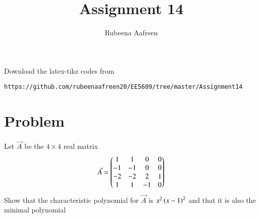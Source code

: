 \documentclass[journal,12pt]{IEEEtran}
\begin{document}
     \def\rightbox#1{\makebox[0in][r]{#1}}
     \def\centbox#1{\makebox[0in]{#1}}
     \def\topbox#1{\raisebox{-\baselineskip}[0in][0in]{#1}}
     \def\midbox#1{\raisebox{-0.5\baselineskip}[0in][0in]{#1}}
\vspace{3cm}
\title{Assignment 14}
\author{Rubeena Aafreen}
\maketitle
\bigskip
\renewcommand{\thefigure}{\theenumi}
\renewcommand{\thetable}{\theenumi}
%
Download the latex-tikz codes from 
%
\begin{lstlisting}
https://github.com/rubeenaafreen20/EE5609/tree/master/Assignment14
\end{lstlisting}
\section{\textbf{Problem}}
%
Let $\Vec{A}$ be the $4\times 4$ real matrix
\begin{align}
    \Vec{A}=\begin{pmatrix}1&1&0&0\\-1&-1&0&0\\-2&-2&2&1\\1&1&-1&0\end{pmatrix}
\end{align}
Show that the characteristic polynomial for $\Vec{A}$ is $x^2\left(x-1\right)^2$ and that it is also the minimal polynomial
\end{document}
